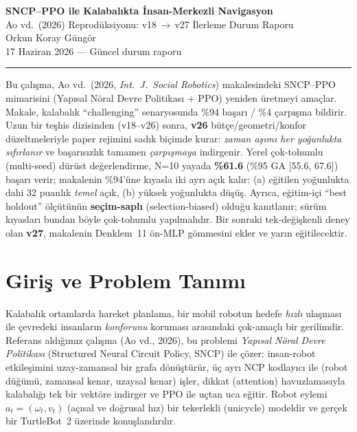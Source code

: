\documentclass[11pt,a4paper]{article}
\begin{document}
\begin{center}
{\LARGE\bfseries SNCP--PPO ile Kalabalıkta İnsan-Merkezli Navigasyon}\\[4pt]
{\large Ao vd.\ (2026) Reprodüksiyonu: v18\,$\rightarrow$\,v27 İlerleme Durum Raporu}\\[10pt]
{\normalsize Orkun Koray Güngör}\\[2pt]
{\small 17 Haziran 2026 — Güncel durum raporu}
\end{center}
\vspace{4pt}
\hrule
\vspace{8pt}

\begin{ozet}
Bu çalışma, Ao vd.\ (2026, \textit{Int.\ J.\ Social Robotics}) makalesindeki SNCP--PPO
mimarisini (Yapısal Nöral Devre Politikası + PPO) yeniden üretmeyi amaçlar. Makale, kalabalık
``challenging'' senaryosunda \%94 başarı / \%4 çarpışma bildirir. Uzun bir teşhis dizisinden
(v18--v26) sonra, \textbf{v26} bütçe/geometri/konfor düzeltmeleriyle paper rejimini sadık biçimde
kurar: \emph{zaman aşımı her yoğunlukta sıfırlanır} ve başarısızlık tamamen \emph{çarpışmaya} indirgenir.
Yerel çok-tohumlu (multi-seed) dürüst değerlendirme, N=10 yayada \textbf{\%61.6} (\%95 GA [55.6, 67.6])
başarı verir; makalenin \%94'üne kıyasla iki ayrı açık kalır: (a) eğitilen yoğunlukta dahi 32 puanlık
\emph{temel} açık, (b) yüksek yoğunlukta düşüş. Ayrıca, eğitim-içi ``best holdout'' ölçütünün
\textbf{seçim-saplı} (selection-biased) olduğu kanıtlanır; sürüm kıyasları bundan böyle çok-tohumlu
yapılmalıdır. Bir sonraki tek-değişkenli deney olan \textbf{v27}, makalenin Denklem~11 ön-MLP
gömmesini ekler ve yarın eğitilecektir.
\end{ozet}

\section{Giriş ve Problem Tanımı}

Kalabalık ortamlarda hareket planlama, bir mobil robotun hedefe \emph{hızlı} ulaşması ile çevredeki
insanların \emph{konforunu} koruması arasındaki çok-amaçlı bir gerilimdir. Referans aldığımız çalışma
(Ao vd., 2026), bu problemi \emph{Yapısal Nöral Devre Politikası} (Structured Neural Circuit Policy,
SNCP) ile çözer: insan-robot etkileşimini uzay-zamansal bir grafa dönüştürür, üç ayrı NCP kodlayıcı ile
(robot düğümü, zamansal kenar, uzaysal kenar) işler, dikkat (attention) havuzlamasıyla kalabalığı tek bir
vektöre indirger ve PPO ile uçtan uca eğitir. Robot eylemi $a_t=(\omega_t, v_t)$ (açısal ve doğrusal hız)
bir tekerlekli (unicycle) modeldir ve gerçek bir TurtleBot~2 üzerinde konuşlandırılır.
\end{document}
